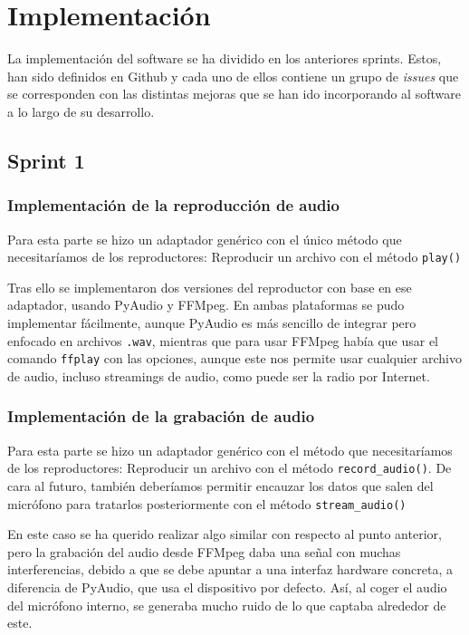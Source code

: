 \chapter{Implementación}

La implementación del software se ha dividido en los anteriores sprints. Estos, han sido definidos en Github
y cada uno de ellos contiene un grupo de \textit{issues} que se corresponden con las distintas
mejoras que se han ido incorporando al software a lo largo de su desarrollo.\\

\section{Sprint 1}
\subsection{Implementación de la reproducción de audio}
Para esta parte se hizo un adaptador genérico con el único método que necesitaríamos
de los reproductores: Reproducir un archivo con el método \texttt{play()}

Tras ello se implementaron dos versiones del reproductor con base en ese adaptador,
usando PyAudio y FFMpeg. En ambas plataformas se pudo implementar fácilmente, aunque PyAudio es más sencillo de integrar pero enfocado en archivos \texttt{.wav}, mientras que para usar FFMpeg había que usar el comando \texttt{ffplay} con las opciones, aunque este nos permite usar cualquier archivo de audio, incluso streamings de audio, como puede ser la radio por Internet.

\subsection{Implementación de la grabación de audio}
Para esta parte se hizo un adaptador genérico con el método que necesitaríamos
de los reproductores: Reproducir un archivo con el método \texttt{record\_audio()}. De cara al futuro, también deberíamos permitir encauzar los datos que salen del micrófono para tratarlos posteriormente con el método \texttt{stream\_audio()}

En este caso se ha querido realizar algo similar con respecto al punto anterior, pero la grabación del audio desde FFMpeg daba una señal con muchas interferencias, debido a que se debe apuntar a una interfaz hardware concreta, a diferencia de PyAudio, que usa el dispositivo por defecto. Así, al coger el audio del micrófono interno, se generaba mucho ruido de lo que captaba alrededor de este.

